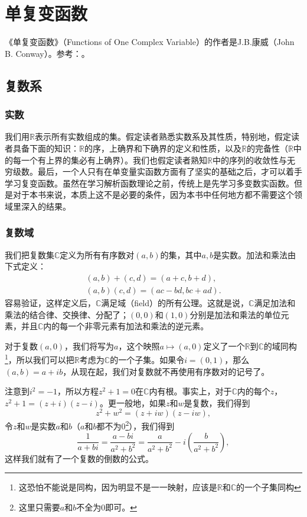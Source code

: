 \chapter{单复变函数}
《单复变函数》（Functions of One Complex Variable）的作者是J.B.康威（John B. Conway）。参考：\cite{FunctionsofOneComplexVariable1978}。

\section{复数系}\label{section00201}

\subsection{实数}\label{subsection0020101}
我们用$\mathbb{R}$表示所有实数组成的集。假定读者熟悉实数系及其性质，特别地，假定读者具备下面的知识：$\mathbb{R}$的序，上确界和下确界的定义和性质，以及$\mathbb{R}$的完备性（$\mathbb{R}$中的每一个有上界的集必有上确界）。我们也假定读者熟知$\mathbb{R}$中的序列的收敛性与无穷级数。最后，一个人只有在单变量实函数方面有了坚实的基础之后，才可以着手学习复变函数。虽然在学习解析函数理论之前，传统上是先学习多变数实函数。但是对于本书来说，本质上这不是必要的条件，因为本书中任何地方都不需要这个领域里深入的结果。

\subsection{复数域}\label{subsection0020102}
我们把复数集$\mathbb{C}$定义为所有有序数对$(a, b)$的集，其中$a,b$是实数。加法和乘法由下式定义：
\begin{gather*}
(a, b) + (c, d) = (a+c, b+d), \\
(a, b)(c, d) = (ac-bd, bc + ad).
\end{gather*}
容易验证，这样定义后，$\mathbb{C}$满足域（field）的所有公理。这就是说，$\mathbb{C}$满足加法和乘法的结合律、交换律、分配了；$(0, 0)$和$(1,0)$分别是加法和乘法的单位元素，并且$\mathbb{C}$内的每一个非零元素有加法和乘法的逆元素。

对于复数$(a, 0)$，我们将写为$a$，这个映照$a \mapsto (a, 0)$定义了一个$\mathbb{R}$到$\mathbb{C}$的域同构\footnote{这恐怕不能说是同构，因为明显不是一一映射，应该是$\mathbb{R}$和$\mathbb{C}$的一个子集同构}，所以我们可以把$\mathbb{R}$考虑为$\mathbb{C}$的一个子集。如果令$i=(0, 1)$，那么$(a, b) = a + ib$，从现在起，我们对复数就不再使用有序数对的记号了。

注意到$i^2=-1$，所以方程$z^2+1=0$在$\mathbb{C}$内有根。事实上，对于$\mathbb{C}$内的每个$z$，$z^2+1=(z+i)(z-i)$。更一般地，如果$z$和$w$是复数，我们得到
\[
z^2+w^2 = (z+iw)(z-iw),
\]
令$z$和$w$是实数$a$和$b$（$a$和$b$都不为0\footnote{这里只需要$a$和$b$不全为0即可。}），我们得到
\[
\frac{1}{a+bi} = \frac{a-bi}{a^2+b^2} = \frac{a}{a^2+b^2} - i(\frac{b}{a^2+b^2}),
\]
这样我们就有了一个复数的倒数的公式。

